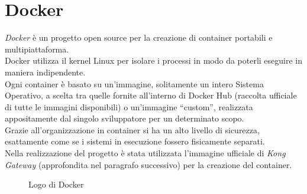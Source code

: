 \section{Docker}
\emph{Docker} è un progetto open source per la creazione di container portabili e multipiattaforma.\\
Docker utilizza il kernel Linux per isolare i processi in modo da poterli eseguire in maniera indipendente.\\
Ogni container è basato su un’immagine, solitamente un intero Sistema Operativo, a scelta tra quelle fornite all’interno di Docker Hub (raccolta ufficiale di tutte le immagini disponibili) o un’immagine “custom”, realizzata appositamente dal singolo sviluppatore per un determinato scopo.\\
Grazie all’organizzazione in container si ha un alto livello di sicurezza, esattamente come se i sistemi in esecuzione fossero fisicamente separati.\\
Nella realizzazione del progetto è stata utilizzata l’immagine ufficiale di \emph{Kong Gateway} (approfondita nel paragrafo successivo) per la creazione del container.
\begin{figure}[ht]
	\centering
	\caption{Logo di Docker}
	\label{fig:one}
\end{figure}

